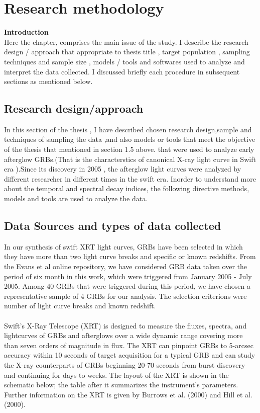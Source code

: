 \setcounter{chapter}{2}
\chapter{Research methodology}
\label{chap:3}
\textbf{Introduction}\\
Here the  chapter, comprises  the main issue of the study. I describe the  research design / approach  that  appropriate  to  thesis title , target population , sampling techniques and sample size , models / tools and softwares used to analyze and interpret the data collected. I discussed briefly each procedure in subsequent sections as mentioned below.
\section{Research design/approach}
In this  section  of the thesis , I have described chosen research design,sample and techniques of sampling the data ,and  also models or tools that meet  the objective of the thesis  that mentioned in section 1.5 above.    that were used to analyze  early afterglow GRBs.(That is the characterstics of canonical X-ray light curve in Swift era ).Since its  discovery in 2005 , the afterglow light curves were analyzed by different researcher in different times in the swift era. Inorder to understand more about the temporal and spectral decay indices, the following directive methods, models and tools are used to analyze the data.

\section{Data Sources and types of data collected }
In our synthesis of swift XRT light curves, GRBs have been selected in which they
have more than two light curve breaks and specific or known redshifts. From the
Evans et al online repository, we have considered GRB data taken over the period of
six month in this work, which were triggered from January 2005 - July 2005. Among
40 GRBs that were triggered during this period, we have chosen a representative
sample of 4 GRBs for our analysis. The selection criterions were number of light
curve breaks and known redshift.\\\\Swift's X-Ray Telescope (XRT) is designed to measure the fluxes, spectra, and lightcurves of GRBs and afterglows over a wide dynamic range covering more than seven orders of magnitude in flux. The XRT can pinpoint GRBs to 5-arcsec accuracy within 10 seconds of target acquisition for a typical GRB and can study the X-ray counterparts of GRBs beginning 20-70 seconds from burst discovery and continuing for days to weeks. The layout of the XRT is shown in the schematic below; the table after it summarizes the instrument's parameters. Further information on the XRT is given by Burrows et al. (2000) and Hill et al. (2000).
